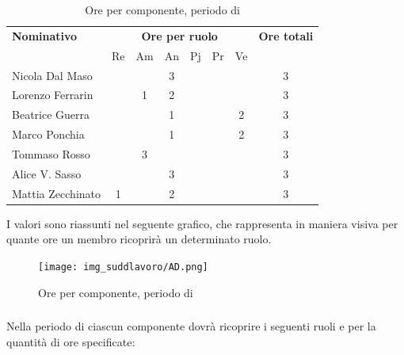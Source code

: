\begin{table}[H]
	\centering
	\begin{tabular}{|l|c|c|c|c|c|c|c|}
		\hline
		\textbf{Nominativo} & 
		\multicolumn{6}{c|}{\textbf{Ore per ruolo}} & 
		\textbf{Ore totali} \\
		& Re & Am & An & Pj & Pr & Ve & \\
		\hline
		Nicola Dal Maso & & & 3 & & &  & 3 \\
		Lorenzo Ferrarin & & 1 & 2 & & &  & 3 \\
		Beatrice Guerra & & & 1 & & & 2 & 3 \\
		Marco Ponchia & & & 1 & & & 2 & 3 \\
		Tommaso Rosso & & 3 & & & & & 3 \\
		Alice V. Sasso & & & 3 & & & & 3 \\
		Mattia Zecchinato & 1 & & 2 & & & & 3 \\
		\hline
	\end{tabular}
	\caption{Ore per componente, periodo di \AD}
\end{table}
I valori sono riassunti nel seguente grafico, che rappresenta in maniera visiva per quante ore un membro ricoprirà un determinato ruolo.
\begin{figure}[H]
	\centering
	\texttt{[image: img\_suddlavoro/AD.png]}
	\caption{Ore per componente, periodo di \AD{}}
\end{figure}

\subsubsection{\PA}
Nella periodo di \PA{} ciascun componente dovrà ricoprire i seguenti ruoli e per la quantità di ore specificate:

